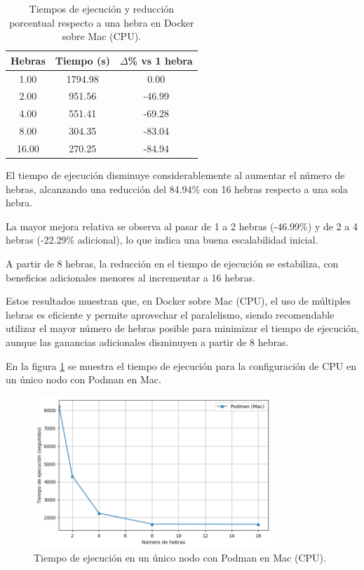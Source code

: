 \begin{table}[ht]
    \centering
    \begin{tabular}{|c|c|c|}
        \hline
        \textbf{Hebras} & \textbf{Tiempo (s)} & \textbf{$\Delta$\% vs 1 hebra} \\
        \hline
        1.00            & 1794.98             & 0.00                           \\
        2.00            & 951.56              & -46.99                         \\
        4.00            & 551.41              & -69.28                         \\
        8.00            & 304.35              & -83.04                         \\
        16.00           & 270.25              & -84.94                         \\
        \hline
    \end{tabular}
    \caption{Tiempos de ejecución y reducción porcentual respecto a una hebra en Docker sobre Mac (CPU).}
    \label{tab:single-node_mac_docker_time}
\end{table}

El tiempo de ejecución disminuye considerablemente al aumentar el número de hebras, alcanzando una reducción del 84.94\% con 16 hebras respecto a una sola hebra.

La mayor mejora relativa se observa al pasar de 1 a 2 hebras (-46.99\%) y de 2 a 4 hebras (-22.29\% adicional), lo que indica una buena escalabilidad inicial.

A partir de 8 hebras, la reducción en el tiempo de ejecución se estabiliza, con beneficios adicionales menores al incrementar a 16 hebras.

Estos resultados muestran que, en Docker sobre Mac (CPU), el uso de múltiples hebras es eficiente y permite aprovechar el paralelismo, siendo recomendable utilizar el mayor número de hebras posible para minimizar el tiempo de ejecución, aunque las ganancias adicionales disminuyen a partir de 8 hebras.

En la figura \ref{fig:single-node_mac_podman_time} se muestra el tiempo de ejecución para la configuración de CPU en un único nodo con Podman en Mac.

\begin{figure}[H]
    \centering
    \includegraphics[width=0.8\textwidth]{imagenes/cap5/single-node_mac_podman_time.png}
    \caption{Tiempo de ejecución en un único nodo con Podman en Mac (CPU).}
    \label{fig:single-node_mac_podman_time}
\end{figure}

